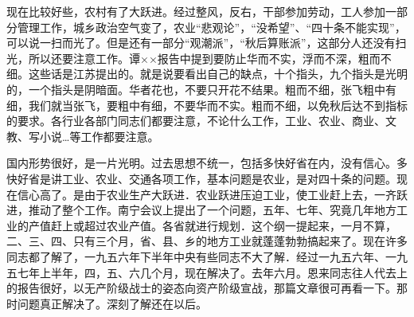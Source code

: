 现在比较好些，农村有了大跃进。经过整风，反右，干部参加劳动，工人参加一部分管理工作，城乡政治空气变了，农业“悲观论”，“没希望”、“四十条不能实现”，可以说一扫而光了。但是还有一部分“观潮派”，“秋后算账派”，这部分人还没有扫光，所以还要注意工作。谭××报告中提到要防止华而不实，浮而不深，粗而不细。这些话是江苏提出的。就是说要看出自己的缺点，十个指头，九个指头是光明的，一个指头是阴暗面。华者花也，不要只开花不结果。粗而不细，张飞粗中有细，我们就当张飞，要粗中有细，不要华而不实。粗而不细，以免秋后达不到指标的要求。各行业各部门同志们都要注意，不论什么工作，工业、农业、商业、文教、写小说…等工作都要注意。

国内形势很好，是一片光明。过去思想不统一，包括多快好省在内，没有信心。多快好省是讲工业、农业、交通各项工作，基本问题是农业，是对四十条的问题。现在信心高了。是由于农业生产大跃进．农业跃进压迫工业，使工业赶上去，一齐跃进，推动了整个工作。南宁会议上提出了一个问题，五年、七年、究竟几年地方工业的产值赶上或超过农业产值。各省就进行规划．这个纲一提起来，一月不算，二、三、四、只有三个月，省、县、乡的地方工业就蓬蓬勃勃搞起来了。现在许多同志都了解了，一九五六年下半年中央有些同志不大了解．经过一九五六年、一九五七年上半年，四，五、六几个月，现在解决了。去年六月。恩来同志往人代去上的报告很好，以无产阶级战士的姿态向资产阶级宣战，那篇文章很可再看一下。那时问题真正解决了。深刻了解还在以后。

